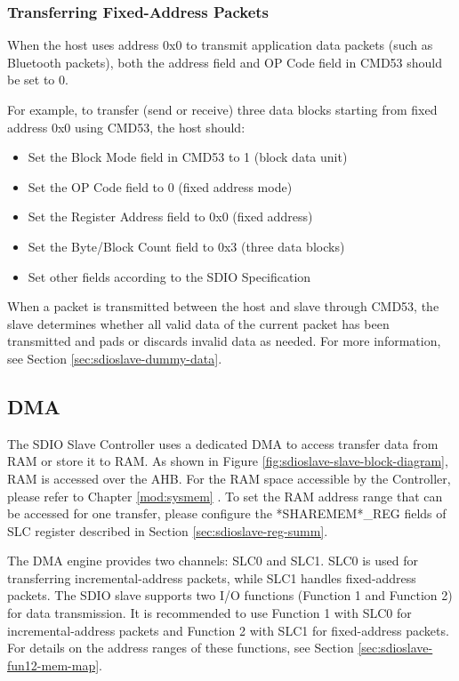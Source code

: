 \documentclass[main\_\_EN.tex]{subfiles}
\begin{document}
\subsubsection{Transferring Fixed-Address Packets}

When the host uses address 0x0 to transmit application data packets (such as Bluetooth packets), both the address field and OP Code field in CMD53 should be set to 0.

For example, to transfer (send or receive) three data blocks starting from fixed address 0x0 using CMD53, the host should:

\begin{itemize}
    \item Set the Block Mode field in CMD53 to 1 (block data unit)
    \item Set the OP Code field to 0 (fixed address mode)
    \item Set the Register Address field to 0x0 (fixed address)
    \item Set the Byte/Block Count field to 0x3 (three data blocks)
    \item Set other fields according to the SDIO Specification
\end{itemize}

When a packet is transmitted between the host and slave through CMD53, the slave determines whether all valid data of the current packet has been transmitted and pads or discards invalid data as needed. For more information, see Section \ref{sec:sdioslave-dummy-data}.

\subsection{DMA}
\label{sec:sdioslave-dma}

The SDIO Slave Controller uses a dedicated DMA to access transfer data from RAM or store it to RAM. As shown in Figure \ref{fig:sdioslave-slave-block-diagram}, RAM is accessed over the AHB. For the RAM space accessible by the Controller, please refer to Chapter \ref{mod:sysmem} \textit{}. To set the RAM address range that can be accessed for one transfer, please configure the *SHAREMEM*\_REG fields of SLC register described in Section \ref{sec:sdioslave-reg-summ}.

The DMA engine provides two channels: SLC0 and SLC1. SLC0 is used for transferring incremental-address packets, while SLC1 handles fixed-address packets. The SDIO slave supports two I/O functions (Function 1 and Function 2) for data transmission. It is recommended to use Function 1 with SLC0 for incremental-address packets and Function 2 with SLC1 for fixed-address packets. For details on the address ranges of these functions, see Section \ref{sec:sdioslave-fun12-mem-map}.
\end{document}

